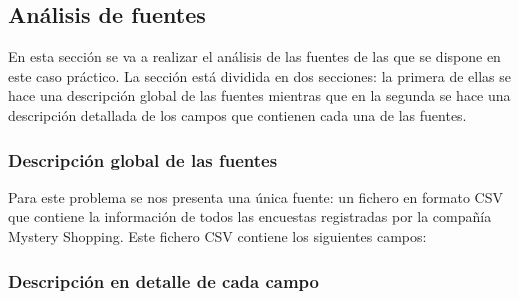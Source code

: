 \medskip
\subsection{Análisis de fuentes}
\label{01}
En esta sección se va a realizar el análisis de las fuentes de las que se dispone en este caso práctico. La sección está dividida en dos secciones: la primera de ellas se hace una descripción global de las fuentes mientras que en la segunda se hace una descripción detallada de los campos que contienen cada una de las fuentes.


\medskip
\subsubsection{Descripción global de las fuentes}
Para este problema se nos presenta una única fuente: un fichero en formato CSV que contiene la información de todos las encuestas registradas por la compañía Mystery Shopping. Este fichero CSV contiene los siguientes campos:


\medskip
\subsubsection{Descripción en detalle de cada campo}

